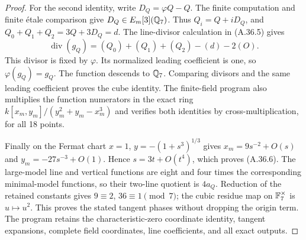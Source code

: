\begin{proof}
For the second identity, write
$D_Q=\varphi Q-Q$. The finite computation and finite
\'etale comparison give $D_Q\in E_m[3](\mathbb Q_7)$.
Thus $Q_i=Q+iD_Q$, and
$Q_0+Q_1+Q_2=3Q+3D_Q=d$.
The line-divisor calculation in (A.36.5) gives
\[
       \operatorname{div}(g_Q)
                  =(Q_0)+(Q_1)+(Q_2)-(d)-2(O).
\]
This divisor is fixed by $\varphi$. Its normalized
leading coefficient is one, so $\varphi(g_Q)=g_Q$.
The function descends to $\mathbb Q_7$. Comparing divisors
and the same leading coefficient proves the cube
identity. The finite-field program also multiplies
the function numerators in the exact ring
$k[x_m,y_m]/(y_m^2+y_m-x_m^3)$ and verifies both
identities by cross-multiplication, for all 18 points.

Finally on the Fermat chart $x=1$,
$y=-(1+s^3)^{1/3}$ gives
$x_m=9s^{-2}+O(s)$ and $y_m=-27s^{-3}+O(1)$.
Hence $s=3t+O(t^4)$, which proves (A.36.6).
The large-model line and vertical functions are eight
and four times the corresponding minimal-model
functions, so their two-line quotient is $4a_Q$.
Reduction of the retained constants gives
$9\equiv2$, $36\equiv1\pmod7$; the cubic residue
map on $\mathbb F_7^\times$ is $u\mapsto u^2$.
This proves the stated tangent phases without dropping
the origin term. The program retains the characteristic-zero
coordinate identity, tangent expansions, complete field
coordinates, line coefficients, and all exact outputs.
\end{proof}

